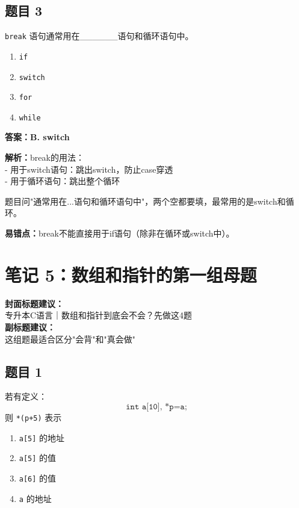 \documentclass[12pt,a4paper]{ctexart}
\begin{document}
\subsection*{题目 3}
\texttt{break} 语句通常用在\_\_\_\_\_\_语句和循环语句中。
\begin{enumerate}[label=\Alph*.]
	\item \texttt{if}
	\item \texttt{switch}
	\item \texttt{for}
	\item \texttt{while}
\end{enumerate}

\begin{answerbox}
	\textbf{答案：B. switch}

	\textbf{解析：}break的用法：\\
	- 用于switch语句：跳出switch，防止case穿透\\
	- 用于循环语句：跳出整个循环

	题目问"通常用在...语句和循环语句中"，两个空都要填，最常用的是switch和循环。

	\textbf{易错点：}break不能直接用于if语句（除非在循环或switch中）。
\end{answerbox}

\newpage

\section{笔记 5：数组和指针的第一组母题}
\begin{coverbox}
	\textbf{封面标题建议：}\\
	专升本C语言｜数组和指针到底会不会？先做这4题\\
	\textbf{副标题建议：}\\
	这组题最适合区分"会背"和"真会做"
\end{coverbox}

\subsection*{题目 1}
若有定义：
\[
	\texttt{int a[10], *p=a;}
\]
则 \texttt{*(p+5)} 表示
\begin{enumerate}[label=\Alph*.]
	\item \texttt{a[5]} 的地址
	\item \texttt{a[5]} 的值
	\item \texttt{a[6]} 的值
	\item \texttt{a} 的地址
\end{enumerate}
\end{document}
